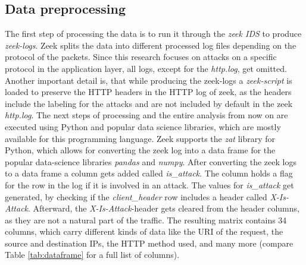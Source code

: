 \subsection{Data preprocessing}
\label{subsec:dataset}
The first step of processing the data is to run it through the \emph{zeek IDS} to produce \emph{zeek-logs}. Zeek splits the data into different processed log files depending on the protocol of the packets. Since this research focuses on attacks on a specific protocol in the application layer, all logs, except for the \emph{http.log}, get omitted. Another important detail is, that while producing the zeek-logs a \emph{zeek-script} is loaded to preserve the HTTP headers in the HTTP log of zeek, as the headers include the labeling for the attacks and are not included by default in the zeek \emph{http.log}. The next steps of processing and the entire analysis from now on are executed using Python and popular data science libraries, which are mostly available for this programming language. Zeek supports the \emph{zat} library for Python, which allows for converting the zeek log into a data frame for the popular data-science libraries \emph{pandas} and \emph{numpy}. After converting the zeek logs to a data frame a column gets added called \emph{is\_attack}. The column holds a flag for the row in the log if it is involved in an attack. The values for \emph{is\_attack} get generated, by checking if the \emph{client\_header} row includes a header called \emph{X-Is-Attack}. Afterward, the \emph{X-Is-Attack}-header gets cleared from the header columns, as they are not a natural part of the traffic. The resulting matrix contains 34 columns, which carry different kinds of data like the URI of the request, the source and destination IPs, the HTTP method used, and many more (compare Table \ref{tab:dataframe} for a full list of columns).


